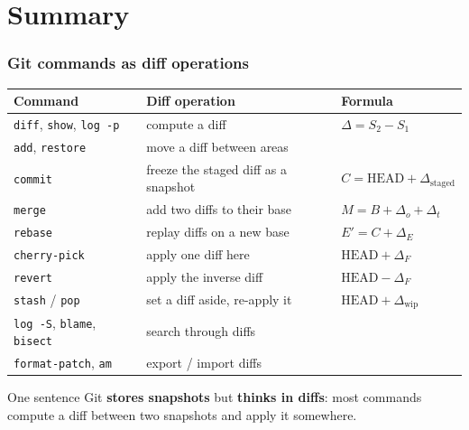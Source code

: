 \documentclass[aspectratio=169,10pt,compress]{beamer}
\newcommand{\cmd}[1]{\texttt{\color{gitred}#1}}
\begin{document}
\section[Summary]{Summary}

\begin{frame}[t,fragile] \frametitle{Git commands as diff operations}
  \small
  \begin{tabular}{@{}L{0.25\textwidth}L{0.4\textwidth}L{0.27\textwidth}@{}}
    \toprule
    \textbf{Command} & \textbf{Diff operation} & \textbf{Formula} \\
    \midrule
    \cmd{diff}, \cmd{show}, \cmd{log -p} & compute a diff & $\Delta = S_2 - S_1$ \\
    \cmd{add}, \cmd{restore} & move a diff between areas & \\
    \cmd{commit} & freeze the staged diff as a snapshot & $C = \text{HEAD} + \Delta_{\text{staged}}$ \\
    \cmd{merge} & add two diffs to their base & $M = B + \Delta_o + \Delta_t$ \\
    \cmd{rebase} & replay diffs on a new base & $E' = C + \Delta_E$ \\
    \cmd{cherry-pick} & apply one diff here & $\text{HEAD} + \Delta_F$ \\
    \cmd{revert} & apply the inverse diff & $\text{HEAD} - \Delta_F$ \\
    \cmd{stash} / \cmd{pop} & set a diff aside, re-apply it & $\text{HEAD} + \Delta_{\text{wip}}$ \\
    \cmd{log -S}, \cmd{blame}, \cmd{bisect} & search through diffs & \\
    \cmd{format-patch}, \cmd{am} & export / import diffs & \\
    \bottomrule
  \end{tabular}

  \vspace{0.8em}
  \normalsize
  \begin{block}{One sentence}
    Git \textbf{stores snapshots} but \textbf{thinks in diffs}: most commands compute a diff
    between two snapshots and apply it somewhere.
  \end{block}
\end{frame}
\end{document}
